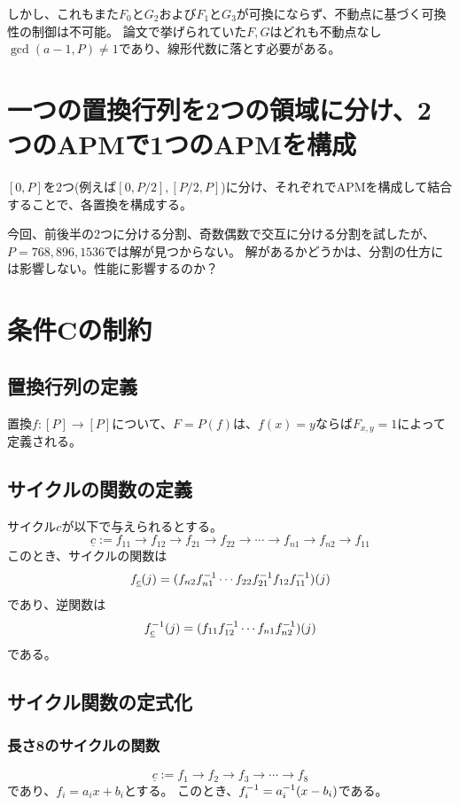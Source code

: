 \documentclass[a4paper,11pt,dvipdfmx]{jsarticle}
\theoremstyle{definition}
\begin{document}
しかし、これもまた$F_0$と$G_2$および$F_1$と$G_3$が可換にならず、不動点に基づく可換性の制御は不可能。
論文で挙げられていた$F,G$はどれも不動点なし$\gcd(a-1, P)\neq1$であり、線形代数に落とす必要がある。

\section{一つの置換行列を2つの領域に分け、2つのAPMで1つのAPMを構成}
$[0,P]$を2つ(例えば$[0, P/2],[P/2, P]$)に分け、それぞれでAPMを構成して結合することで、各置換を構成する。

今回、前後半の2つに分ける分割、奇数偶数で交互に分ける分割を試したが、$P=768, 896, 1536$では解が見つからない。
解があるかどうかは、分割の仕方には影響しない。性能に影響するのか？

\section{条件Cの制約}
\subsection{置換行列の定義}
置換$f: [P]\rightarrow [P]$について、$F=P(f)$は、$f(x)=y$ならば$F_{x,y}=1$によって定義される。

\subsection{サイクルの関数の定義}
サイクル$c$が以下で与えられるとする。
\[
\underline{c} := f_{11} \rightarrow f_{12} \rightarrow f_{21} \rightarrow f_{22} \rightarrow \cdots\rightarrow f_{n1} \rightarrow f_{n2} \rightarrow f_{11}
\]
このとき、サイクルの関数は
\[
f_{\underline{c}}(j) = (f_{n2}f^{-1}_{n1}\cdots f_{22}f^{-1}_{21}f_{12}f^{-1}_{11})(j)
\]
であり、逆関数は
\[
f_{\underline{c}}^{-1}(j) = (f_{11}f^{-1}_{12}\cdots f_{n1}f^{-1}_{n2})(j)
\]
である。
\subsection{サイクル関数の定式化}
\subsubsection{長さ8のサイクルの関数}
\[
  \underline{c} := f_{1} \rightarrow f_{2} \rightarrow f_{3} \rightarrow \cdots \rightarrow f_{8}
  \]
  であり、$f_i = a_i x + b_i$とする。
  このとき、$f_i^{-1} = a_i^{-1}(x - b_i)$である。
\end{document}

